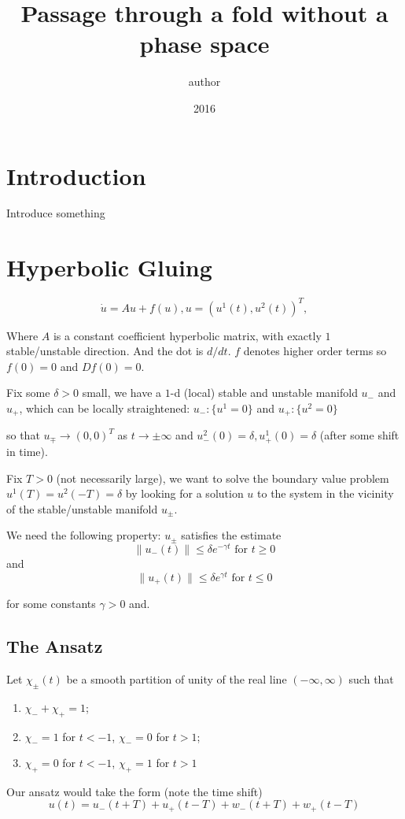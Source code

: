 \documentclass[letterpaper,11pt]{article}
\title{Passage through a fold without a phase space}
\author{author}
\date{2016}
\numberwithin{equation}{section}
\theoremstyle{plain}
\begin{document}
\section{Introduction}

Introduce something


\section{Hyperbolic Gluing}
\[
\dot{u} = Au + f(u),  u=(u^1(t),u^2(t))^T,
\] 

Where $A$ is a constant coefficient hyperbolic matrix, with exactly $1$ stable/unstable direction. And the dot is $d/dt$. $f$ denotes higher order terms so $f(0)=0$ and $Df(0)=0$.

Fix some $\delta > 0$ small, we have a $1$-d (local) stable and unstable manifold $u_{-}$ and $u_{+}$, which can be locally straightened: $u_- : \{u^1 = 0\}$ and $u_+ : \{ u^2 = 0\}$

so that $u_{\mp} \to (0,0)^T$ as $t\to \pm \infty$ and $u_{-}^2 (0) =\delta, u_{+}^1 (0) =\delta$ (after some shift in time).

Fix $T > 0$ (not necessarily large), we want to solve the boundary value problem $u^1(T) = u^2(-T)=\delta$ by looking for a solution $u$ to the system in the vicinity of the stable/unstable manifold $u_{\pm}$.

We need the following property: $u_{\pm}$ satisfies the estimate
\[
\|u_-(t)\| \le \delta e^{-\gamma t} \text{ for }t\ge 0
\]
and
\[
\|u_+(t)\| \le \delta e^{\gamma t} \text{ for }t \le 0
\]

for some constants $\gamma >0$ and.

\subsection{The Ansatz}

Let $\chi_{\pm}(t)$ be a smooth partition of unity of the real line $(-\infty,\infty)$ such that 
\begin{enumerate}	
\item $\chi_{-}+\chi_+= 1$; 
\item $\chi_{-} = 1$ for $t<-1$, $\chi_- =0$ for $t>1$;
\item $\chi_+ = 0$ for $t<-1$, $\chi_+ =1$ for $t>1$ 
\end{enumerate}

Our ansatz would take the form (note the time shift)
\[
u(t) =  u_-(t+T) + u_+(t-T)+w_-(t+T)+w_+(t-T)
\]
\end{document}
